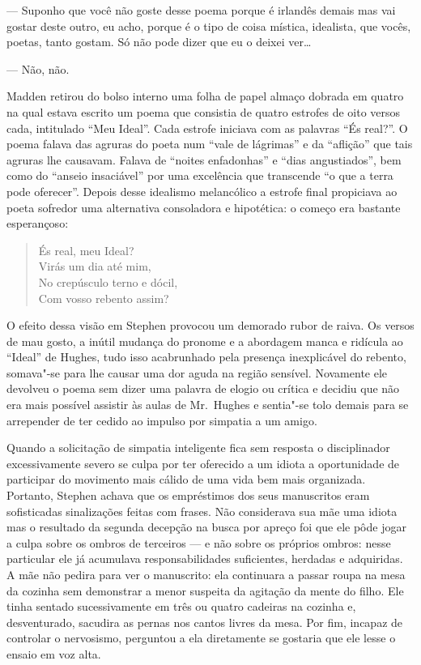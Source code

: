 --- Suponho que você não goste desse poema porque é irlandês
demais mas vai gostar deste outro, eu acho, porque é o tipo de coisa
mística, idealista, que vocês, poetas, tanto gostam.  Só não pode dizer
que eu o deixei ver\ldots{}

--- Não, não.

Madden retirou do bolso interno uma folha de papel almaço dobrada em
quatro na qual estava escrito um poema que consistia de quatro estrofes
de oito versos cada, intitulado “Meu Ideal”.  Cada estrofe iniciava com
as palavras “És real?”.  O poema falava das agruras do poeta num “vale
de lágrimas” e da “aflição” que tais agruras lhe causavam.  Falava de
“noites enfadonhas” e “dias angustiados”, bem como do “anseio
insaciável” por uma excelência que transcende “o que a terra pode
oferecer”.  Depois desse idealismo melancólico a estrofe final
propiciava ao poeta sofredor uma alternativa consoladora e hipotética:
o começo era bastante esperançoso:

\begin{verse}
És real, meu Ideal?\\
Virás um dia até mim,\\
No crepúsculo terno e dócil,\\
Com vosso rebento assim?
\end{verse}

O efeito dessa visão em Stephen provocou um demorado rubor
de raiva.  Os versos de mau gosto, a inútil mudança do pronome e a
abordagem manca e ridícula ao “Ideal” de Hughes, tudo isso acabrunhado
pela presença inexplicável do rebento, somava"-se para lhe causar uma
dor aguda na região sensível.  Novamente ele devolveu o poema sem dizer
uma palavra de elogio ou crítica e decidiu que não era mais possível
assistir às aulas de Mr.~Hughes e sentia"-se tolo demais para se
arrepender de ter cedido ao impulso por simpatia a um amigo.

Quando a solicitação de simpatia inteligente fica sem resposta o
disciplinador excessivamente severo se culpa por ter oferecido a um
idiota a oportunidade de participar do movimento mais cálido de uma
vida bem mais organizada.  Portanto, Stephen achava que os empréstimos
dos seus manuscritos eram sofisticadas \label{sinalizacoes"-feitas} sinalizações feitas com
frases.  Não considerava sua mãe uma idiota mas o resultado da segunda
decepção na busca por apreço foi que ele pôde jogar a culpa sobre os
ombros de terceiros --- e não sobre os próprios ombros: nesse
particular ele já acumulava responsabilidades suficientes, herdadas e
adquiridas.  A mãe não pedira para ver o manuscrito: ela continuara a
passar roupa na mesa da cozinha sem demonstrar \label{a"-menor} a menor suspeita da
agitação da mente do filho.  Ele tinha sentado sucessivamente em três
ou quatro cadeiras na cozinha e, desventurado, sacudira as pernas nos
cantos livres da mesa.  Por fim, incapaz de controlar o nervosismo,
perguntou a ela diretamente se gostaria que ele lesse o ensaio em voz
alta.

